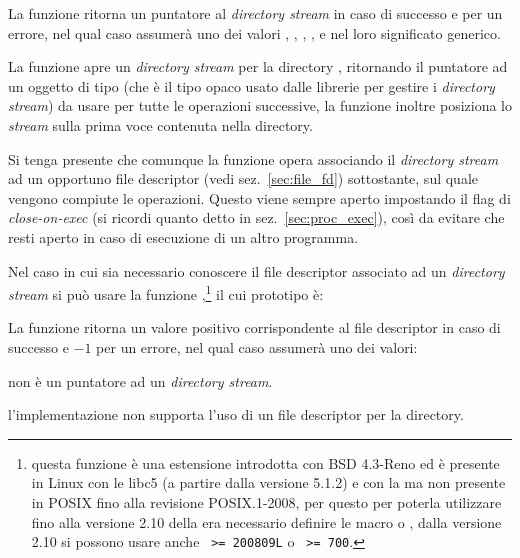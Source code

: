 \begin{funcproto}{
}
{La funzione ritorna un puntatore al \textit{directory stream} in caso di
  successo e  per un errore, nel qual caso  assumerà uno
  dei valori , , ,
  ,  e  nel loro significato
  generico.}
\end{funcproto}

La funzione apre un \textit{directory stream} per la directory
, ritornando il puntatore ad un oggetto di tipo  (che
è il tipo opaco usato dalle librerie per gestire i \textit{directory stream})
da usare per tutte le operazioni successive, la funzione inoltre posiziona lo
\textit{stream} sulla prima voce contenuta nella directory.

Si tenga presente che comunque la funzione opera associando il
\textit{directory stream} ad un opportuno file descriptor (vedi
sez.~\ref{sec:file_fd}) sottostante, sul quale vengono compiute le
operazioni. Questo viene sempre aperto impostando il flag di
\textit{close-on-exec} (si ricordi quanto detto in sez.~\ref{sec:proc_exec}),
così da evitare che resti aperto in caso di esecuzione di un altro programma.

Nel caso in cui sia necessario conoscere il file descriptor associato ad un
\textit{directory stream} si può usare la funzione
,\footnote{questa funzione è una estensione introdotta con BSD
  4.3-Reno ed è presente in Linux con le libc5 (a partire dalla versione
  5.1.2) e con la  ma non presente in POSIX fino alla revisione
  POSIX.1-2008, per questo per poterla utilizzare fino alla versione 2.10
  della  era necessario definire le macro  o
  , dalla versione 2.10 si possono usare anche
  \texttt{ >= 200809L} o
  \texttt{ >= 700}.}  il cui prototipo è:

\begin{funcproto}{
}
{La funzione ritorna un valore positivo corrispondente al file descriptor in
  caso di successo e $-1$ per un errore, nel qual caso  assumerà
  uno dei valori:
  \begin{errlist}
  \item[\errcode{EINVAL}]  non è un puntatore ad un
    \textit{directory stream}. 
  \item[\errcode{ENOTSUP}] l'implementazione non supporta l'uso di un file
    descriptor per la directory.
  \end{errlist}
}
\end{funcproto}

